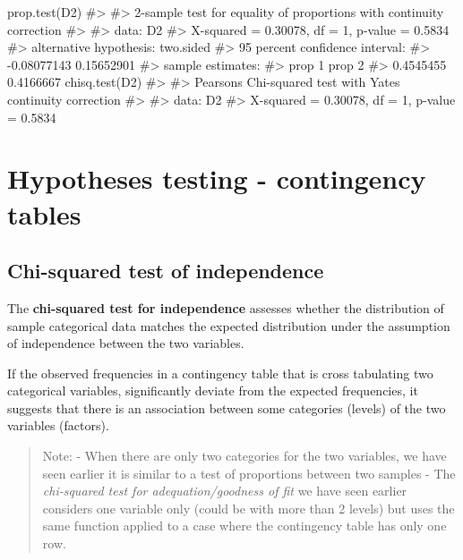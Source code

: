 \documentclass[
  letterpaper,
  DIV=11,
  numbers=noendperiod]{scrreprt}
\newenvironment{Shaded}{\begin{snugshade}}{\end{snugshade}}
\newcommand{\CommentTok}[1]{\textcolor[rgb]{0.37,0.37,0.37}{#1}}
\newcommand{\FunctionTok}[1]{\textcolor[rgb]{0.28,0.35,0.67}{#1}}
\newcommand{\NormalTok}[1]{\textcolor[rgb]{0.00,0.23,0.31}{#1}}
\begin{document}
\begin{Shaded}
\begin{Highlighting}[]
\FunctionTok{prop.test}\NormalTok{(D2)}
\CommentTok{\#\textgreater{} }
\CommentTok{\#\textgreater{}  2{-}sample test for equality of proportions with continuity correction}
\CommentTok{\#\textgreater{} }
\CommentTok{\#\textgreater{} data:  D2}
\CommentTok{\#\textgreater{} X{-}squared = 0.30078, df = 1, p{-}value = 0.5834}
\CommentTok{\#\textgreater{} alternative hypothesis: two.sided}
\CommentTok{\#\textgreater{} 95 percent confidence interval:}
\CommentTok{\#\textgreater{}  {-}0.08077143  0.15652901}
\CommentTok{\#\textgreater{} sample estimates:}
\CommentTok{\#\textgreater{}    prop 1    prop 2 }
\CommentTok{\#\textgreater{} 0.4545455 0.4166667}
\FunctionTok{chisq.test}\NormalTok{(D2)}
\CommentTok{\#\textgreater{} }
\CommentTok{\#\textgreater{}  Pearson\textquotesingle{}s Chi{-}squared test with Yates\textquotesingle{} continuity correction}
\CommentTok{\#\textgreater{} }
\CommentTok{\#\textgreater{} data:  D2}
\CommentTok{\#\textgreater{} X{-}squared = 0.30078, df = 1, p{-}value = 0.5834}
\end{Highlighting}
\end{Shaded}

\chapter{Hypotheses testing - contingency
tables}\label{hypotheses-testing---contingency-tables}

\section{Chi-squared test of
independence}\label{chi-squared-test-of-independence}

The \textbf{chi-squared test for independence} assesses whether the
distribution of sample categorical data matches the expected
distribution under the assumption of independence between the two
variables.

If the observed frequencies in a contingency table that is cross
tabulating two categorical variables, significantly deviate from the
expected frequencies, it suggests that there is an association between
some categories (levels) of the two variables (factors).

\begin{quote}
Note: - When there are only two categories for the two variables, we
have seen earlier it is similar to a test of proportions between two
samples - The \emph{chi-squared test for adequation/goodness of fit} we
have seen earlier considers one variable only (could be with more than 2
levels) but uses the same function applied to a case where the
contingency table has only one row.
\end{quote}
\end{document}
